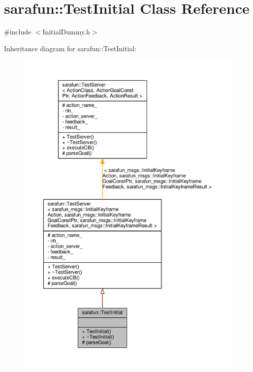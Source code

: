 \hypertarget{classsarafun_1_1TestInitial}{\section{sarafun\-:\-:Test\-Initial Class Reference}
\label{classsarafun_1_1TestInitial}
}


{\ttfamily \#include $<$Initial\-Dummy.\-h$>$}



Inheritance diagram for sarafun\-:\-:Test\-Initial\-:\nopagebreak
\begin{figure}[H]
\begin{center}
\leavevmode
\includegraphics[width=350pt]{de/df0/classsarafun_1_1TestInitial__inherit__graph}
\end{center}
\end{figure}


